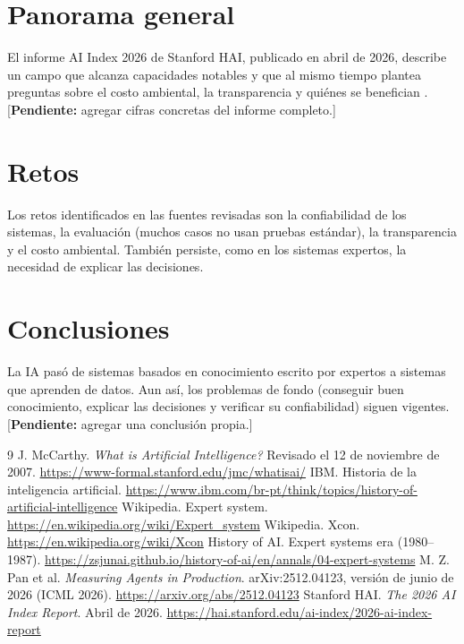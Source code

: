 \documentclass[11pt,a4paper]{article}
\begin{document}
\section{Panorama general}
El informe AI Index 2026 de Stanford HAI, publicado en abril de 2026, describe un campo que alcanza capacidades notables y que al mismo tiempo plantea preguntas sobre el costo ambiental, la transparencia y qui\'enes se benefician \cite{aiindex}. [\textbf{Pendiente:} agregar cifras concretas del informe completo.]

\section{Retos}
Los retos identificados en las fuentes revisadas son la confiabilidad de los sistemas, la evaluaci\'on (muchos casos no usan pruebas est\'andar), la transparencia y el costo ambiental. Tambi\'en persiste, como en los sistemas expertos, la necesidad de explicar las decisiones.

\section{Conclusiones}
La IA pas\'o de sistemas basados en conocimiento escrito por expertos a sistemas que aprenden de datos. Aun as\'i, los problemas de fondo (conseguir buen conocimiento, explicar las decisiones y verificar su confiabilidad) siguen vigentes. [\textbf{Pendiente:} agregar una conclusi\'on propia.]

\begin{thebibliography}{9}
 J. McCarthy. \emph{What is Artificial Intelligence?} Revisado el 12 de noviembre de 2007. \url{https://www-formal.stanford.edu/jmc/whatisai/}
 IBM. Historia de la inteligencia artificial. \url{https://www.ibm.com/br-pt/think/topics/history-of-artificial-intelligence}
 Wikipedia. Expert system. \url{https://en.wikipedia.org/wiki/Expert_system}
 Wikipedia. Xcon. \url{https://en.wikipedia.org/wiki/Xcon}
 History of AI. Expert systems era (1980--1987). \url{https://zsjunai.github.io/history-of-ai/en/annals/04-expert-systems}
 M. Z. Pan et al. \emph{Measuring Agents in Production}. arXiv:2512.04123, versi\'on de junio de 2026 (ICML 2026). \url{https://arxiv.org/abs/2512.04123}
 Stanford HAI. \emph{The 2026 AI Index Report}. Abril de 2026. \url{https://hai.stanford.edu/ai-index/2026-ai-index-report}
\end{thebibliography}
\end{document}
